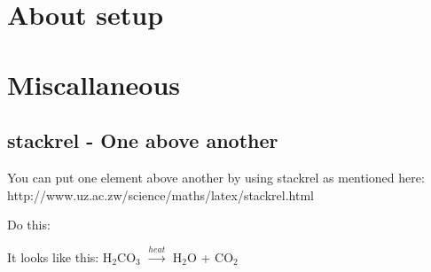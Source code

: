 \documentclass[a4paper,extrafontsizes,12pt,article]{memoir}
\newcommand{\showpart}[1]{\noindent}
\begin{document}
\chapter{About setup}

\showpart{HEADER}

\chapter{Miscallaneous}

\section{stackrel - One above another}

You can put one element above another by using stackrel as mentioned here:
http://www.uz.ac.zw/science/maths/latex/stackrel.html

Do this: \showpart{BOO}

It looks like this:
H$_2$CO$_3$ $\stackrel{heat}{\longrightarrow}$ H$_2$O + CO$_2$
\end{document}
